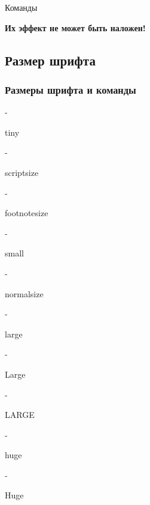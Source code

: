\documentclass [a4paper,oneside,final,14pt]{extarticle}
\begin{document}
Команды 

\bf Их эффект не может быть наложен! \label{label1}
\normalfont
\subsection{Размер шрифта} 
\subsubsection{Размеры шрифта и команды}

 - \begin{tiny} tiny \end{tiny}

 - \begin{scriptsize} scriptsize \end{scriptsize}

 - \begin{footnotesize} footnotesize \end{footnotesize}

 - \begin{small} small \end{small}

 - \begin{normalsize} normalsize \end{normalsize}

 - \begin{large} large \end{large}

 - \begin{Large} Large \end{Large}

 - \begin{LARGE} LARGE \end{LARGE}

 - \begin{huge} huge \end{huge}

 - \begin{Huge} Huge \end{Huge}
\end{document}
